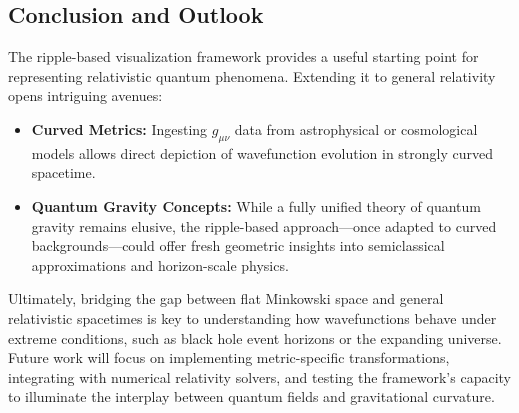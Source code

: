 \subsection{Conclusion and Outlook}
The ripple-based visualization framework provides a useful starting point for representing relativistic quantum phenomena. Extending it to general relativity opens intriguing avenues:
\begin{itemize}
    \item \textbf{Curved Metrics:} Ingesting \(g_{\mu\nu}\) data from astrophysical or cosmological models allows direct depiction of wavefunction evolution in strongly curved spacetime.
    \item \textbf{Quantum Gravity Concepts:} While a fully unified theory of quantum gravity remains elusive, the ripple-based approach—once adapted to curved backgrounds—could offer fresh geometric insights into semiclassical approximations and horizon-scale physics.
\end{itemize}

Ultimately, bridging the gap between flat Minkowski space and general relativistic spacetimes is key to understanding how wavefunctions behave under extreme conditions, such as black hole event horizons or the expanding universe. Future work will focus on implementing metric-specific transformations, integrating with numerical relativity solvers, and testing the framework’s capacity to illuminate the interplay between quantum fields and gravitational curvature.




